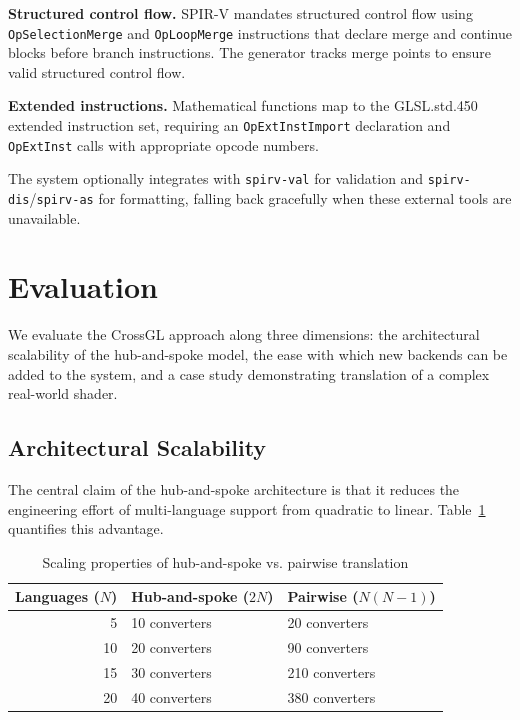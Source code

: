 \documentclass{svproc}
\begin{document}
\textbf{Structured control flow.} SPIR-V mandates structured control flow using \texttt{OpSelectionMerge} and \texttt{OpLoopMerge} instructions that declare merge and continue blocks before branch instructions. The generator tracks merge points to ensure valid structured control flow.

\textbf{Extended instructions.} Mathematical functions map to the GLSL.std.450 extended instruction set, requiring an \texttt{OpExtInstImport} declaration and \texttt{OpExtInst} calls with appropriate opcode numbers.

The system optionally integrates with \texttt{spirv-val} for validation and \texttt{spirv-dis}/\texttt{spirv-as} for formatting, falling back gracefully when these external tools are unavailable.
\section{Evaluation}

We evaluate the CrossGL approach along three dimensions: the architectural scalability of the hub-and-spoke model, the ease with which new backends can be added to the system, and a case study demonstrating translation of a complex real-world shader.

\subsection{Architectural Scalability}

The central claim of the hub-and-spoke architecture is that it reduces the engineering effort of multi-language support from quadratic to linear. Table~\ref{tab:complexity} quantifies this advantage.

\begin{table}
\caption{Scaling properties of hub-and-spoke vs. pairwise translation}
\label{tab:complexity}
\begin{center}
\begin{tabular}{r@{\quad}ll}
\hline
\multicolumn{1}{l}{\rule{0pt}{12pt}\textbf{Languages ($N$)}} & \textbf{Hub-and-spoke ($2N$)} & \textbf{Pairwise ($N(N-1)$)} \\[2pt]
\hline\rule{0pt}{12pt}
5 & 10 converters & 20 converters \\
10 & 20 converters & 90 converters \\
15 & 30 converters & 210 converters \\
20 & 40 converters & 380 converters \\[2pt]
\hline
\end{tabular}
\end{center}
\end{table}
\end{document}
